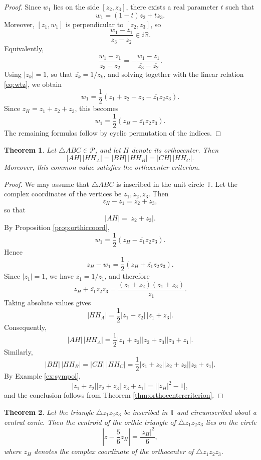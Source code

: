 \documentclass[11pt,reqno]{amsart}
\newtheorem{theorem}{Theorem}[section]
\theoremstyle{definition}
\numberwithin{equation}{section}
\begin{document}
\begin{proof}
Since $w_1$ lies on the side $[z_2,z_3]$, there exists a real
parameter $t$ such that
\begin{equation}\label{eq:wtz}
    w_1=(1-t)z_2+tz_3.
\end{equation}
Moreover, $[z_1,w_1]$ is perpendicular to $[z_2,z_3]$, so
\[
\frac{w_1-z_1}{z_3-z_2}\in i\mathbb R.
\]
Equivalently,
\[
\frac{w_1-z_1}{z_3-z_2}
=
-\frac{\overline{w_1}-\overline{z_1}}
{\overline{z_3}-\overline{z_2}}.
\]
Using $|z_k|=1$, so that $\overline{z_k}=1/z_k$, and solving together with the linear relation \eqref{eq:wtz}, we obtain
\[
w_1=\frac12\left(z_1+z_2+z_3-\overline{z_1}z_2z_3\right).
\]
Since $z_H=z_1+z_2+z_3$, this becomes
\[
w_1=\frac12\left(z_H-\overline{z_1}z_2z_3\right).
\]
The remaining formulas follow by cyclic permutation of the indices.
\end{proof}

\begin{theorem}\label{thm:AH_HHA}
Let $\triangle ABC\in\mathcal P$, and let $H$ denote its orthocenter. Then
\[
|AH|\,|HH_A|
=
|BH|\,|HH_B|
=
|CH|\,|HH_C|.
\]
Moreover, this common value satisfies the orthocenter criterion.
\end{theorem}

\begin{proof}
We may assume that $\triangle ABC$ is inscribed in the unit circle $\mathbb T$. Let the complex coordinates of the vertices be $z_1,z_2,z_3$. Then
\[
z_H-z_1=z_2+z_3,
\]
so that
\[
|AH|=|z_2+z_3|.
\]
By Proposition \ref{prop:orthiccoord},
\[
w_1
=
\frac12\left(z_H-\overline{z_1}z_2z_3\right).
\]
Hence
\[
z_H-w_1
=
\frac12\left(z_H+\overline{z_1}z_2z_3\right).
\]
Since $|z_1|=1$, we have $\overline{z_1}=1/z_1$, and therefore
\[
z_H+\overline{z_1}z_2z_3
=
\frac{(z_1+z_2)(z_1+z_3)}{z_1}.
\]
Taking absolute values gives
\[
|HH_A|
=
\frac12|z_1+z_2|\,|z_1+z_3|.
\]
Consequently,
\[
|AH|\,|HH_A|
=
\frac12
|z_1+z_2|
|z_2+z_3|
|z_3+z_1|.
\]
Similarly,
\[
|BH|\,|HH_B|=|CH|\,|HH_C|=
\frac12
|z_1+z_2|
|z_2+z_3|
|z_3+z_1|.
\] 
By Example \ref{ex:sympol},
\[
|z_1+z_2|
|z_2+z_3|
|z_3+z_1|
=
\bigl||z_H|^2-1\bigr|,
\]
and the conclusion follows from Theorem \ref{thm:orthocentercriterion}.
\end{proof}

\begin{theorem}
Let the triangle $\triangle z_1z_2z_3$ be inscribed in $\mathbb T$ and circumscribed about a central conic. Then the centroid of the orthic triangle of $\triangle z_1z_2z_3$ lies on the circle
\[
\left|z-\frac56z_H\right|
=
\frac{|z_H|^2}{6},
\]
where $z_H$ denotes the complex coordinate of the orthocenter of $\triangle z_1z_2z_3$.
\end{theorem}
\end{document}
